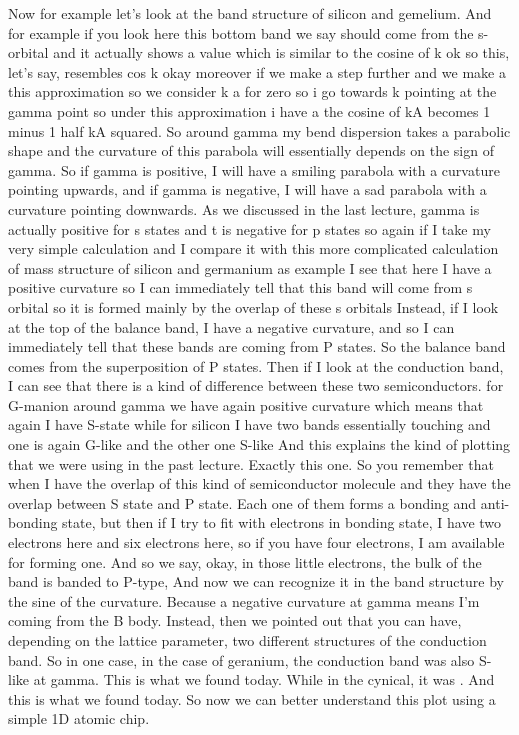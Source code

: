 Now for example let's look at the band structure of silicon and gemelium. And for example if you look here this bottom band we say should come from the s-orbital and it actually shows a value which is similar to the cosine of k ok so this, let's say, resembles cos k okay moreover if we make a step further and we make a this approximation so we consider k a for zero so i go towards k pointing at the gamma point so under this approximation i have a the cosine of kA becomes 1 minus 1 half kA squared. So around gamma my bend dispersion takes a parabolic shape and the curvature of this parabola will essentially depends on the sign of gamma. So if gamma is positive, I will have a smiling parabola with a curvature pointing upwards, and if gamma is negative, I will have a sad parabola with a curvature pointing downwards. As we discussed in the last lecture, gamma is actually positive for s states and t is negative for p states so again if I take my very simple calculation and I compare it with this more complicated calculation of mass structure of silicon and germanium as example I see that here I have a positive curvature so I can immediately tell that this band will come from s orbital so it is formed mainly by the overlap of these s orbitals Instead, if I look at the top of the balance band, I have a negative curvature, and so I can immediately tell that these bands are coming from P states. So the balance band comes from the superposition of P states. Then if I look at the conduction band, I can see that there is a kind of difference between these two semiconductors. for G-manion around gamma we have again positive curvature which means that again I have S-state while for silicon I have two bands essentially touching and one is again G-like and the other one S-like And this explains the kind of plotting that we were using in the past lecture. Exactly this one.
So you remember that when I have the overlap of this kind of semiconductor molecule and they have the overlap between S state and P state. Each one of them forms a bonding and anti-bonding state, but then if I try to fit with electrons in bonding state, I have two electrons here and six electrons here, so if you have four electrons, I am available for forming one. And so we say, okay, in those little electrons, the bulk of the band is banded to P-type, And now we can recognize it in the band structure by the sine of the curvature. Because a negative curvature at gamma means I'm coming from the B body. Instead, then we pointed out that you can have, depending on the lattice parameter, two different structures of the conduction band. So in one case, in the case of geranium, the conduction band was also S-like at gamma. This is what we found today. While in the cynical, it was . And this is what we found today. So now we can better understand this plot using a simple 1D atomic chip.
